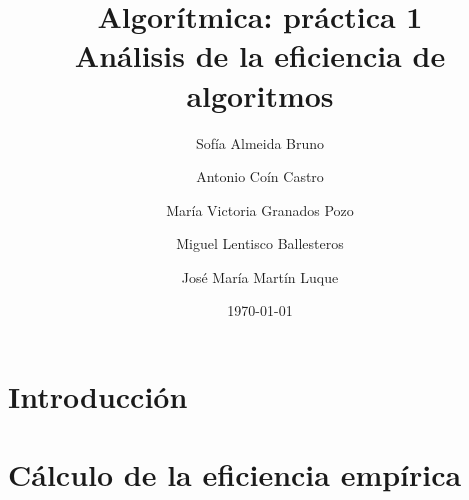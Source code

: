 \documentclass[11pt]{article}
\title{Algorítmica: práctica 1 \\ \large Análisis de la eficiencia de algoritmos}
\author{Sofía Almeida Bruno \and Antonio Coín Castro \and María Victoria Granados Pozo \and Miguel Lentisco Ballesteros \and José María Martín Luque}
\date{\today}
\begin{document}
\maketitle

\newpage

\section*{Introducción}

\lipsum


\section*{Cálculo de la eficiencia empírica}


\begin{center}
	
\end{center}



\begin{center}
	
\end{center}



\begin{center}
	
\end{center}



\begin{center}
	
\end{center}



\begin{center}
	
\end{center}



\begin{center}
	
\end{center}



\begin{center}
	
\end{center}


\begin{center}
	
\end{center}

\begin{center}
	
\end{center}
\end{document}
